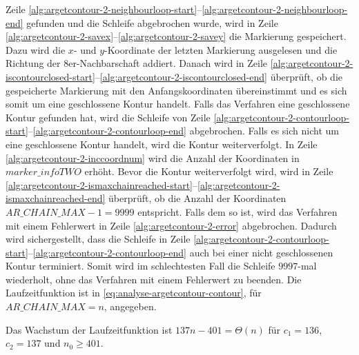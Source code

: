  Zeile \ref{alg:argetcontour-2-neighbourloop-start}--\ref{alg:argetcontour-2-neighbourloop-end} gefunden und die
 Schleife abgebrochen wurde, wird in Zeile \ref{alg:argetcontour-2-savex}--\ref{alg:argetcontour-2-savey} die
 Markierung gespeichert. Dazu wird die $x$- und $y$-Koordinate der letzten Markierung ausgelesen und die Richtung der
 8er-Nachbarschaft addiert. Danach wird in Zeile
 \ref{alg:argetcontour-2-iscontourclosed-start}--\ref{alg:argetcontour-2-iscontourclosed-end} überprüft, ob die
 gespeicherte Markierung mit den Anfangskoordinaten übereinstimmt und es sich somit um eine geschlossene Kontur
 handelt. Falls das Verfahren eine geschlossene Kontur gefunden hat, wird die Schleife von Zeile
 \ref{alg:argetcontour-2-contourloop-start}--\ref{alg:argetcontour-2-contourloop-end} abgebrochen. Falls es sich nicht
 um eine geschlossene Kontur handelt, wird die Kontur weiterverfolgt. In Zeile \ref{alg:argetcontour-2-inccoordnum}
 wird die Anzahl der Koordinaten in $\mathit{marker\_infoTWO}$ erhöht. Bevor die Kontur weiterverfolgt wird, wird in
 Zeile \ref{alg:argetcontour-2-ismaxchainreached-start}--\ref{alg:argetcontour-2-ismaxchainreached-end} überprüft, ob
 die Anzahl der Koordinaten $\mathit{AR\_CHAIN\_MAX} - 1 = 9999$ entspricht. Falls dem so ist, wird das Verfahren mit
 einem Fehlerwert in Zeile \ref{alg:argetcontour-2-error} abgebrochen. Dadurch wird sichergestellt, dass die Schleife
 in Zeile \ref{alg:argetcontour-2-contourloop-start}--\ref{alg:argetcontour-2-contourloop-end} auch bei einer nicht
 geschlossenen Kontur terminiert. Somit wird im schlechtesten Fall die Schleife $9997$-mal wiederholt, ohne das
 Verfahren mit einem Fehlerwert zu beenden. Die Laufzeitfunktion ist in \autoref{eq:analyse-argetcontour-contour},
 für $\mathit{AR\_CHAIN\_MAX} = n$, angegeben.

Das Wachstum der Laufzeitfunktion ist $137n -401 = \Theta(n)$ für $c_{1} = 136$, $c_{2} = 137$ und $n_{0} \geq 401$.

